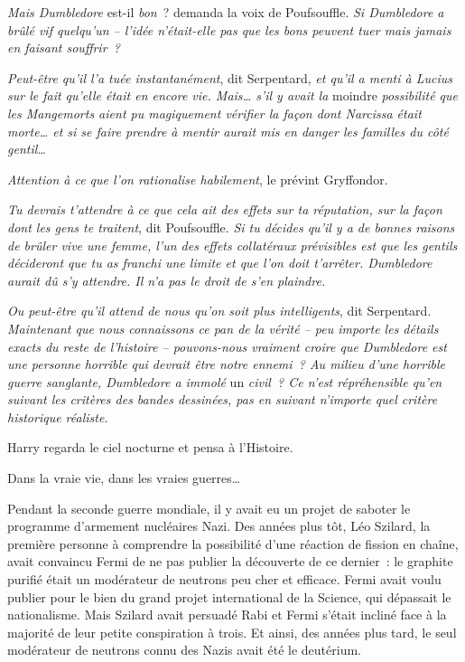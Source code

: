 \emph{Mais Dumbledore} est-il \emph{bon}~? demanda la voix de Poufsouffle.
\emph{Si Dumbledore a brûlé vif quelqu'un -- l'idée n'était-elle pas que les bons peuvent tuer mais jamais en faisant souffrir~?}

\emph{Peut-être qu'il l'a tuée instantanément}, dit Serpentard, \emph{et qu'il a menti à Lucius sur le fait qu'elle était en encore vie.
Mais… s'il y avait la} moindre \emph{possibilité que les Mangemorts aient pu magiquement vérifier la façon dont Narcissa était morte… et si se faire prendre à mentir aurait mis en danger les familles du côté gentil…}

\emph{Attention à ce que l'on rationalise habilement}, le prévint Gryffondor.

\emph{Tu devrais t'attendre à ce que cela ait des effets sur ta réputation, sur la façon dont les gens te traitent}, dit Poufsouffle.
\emph{Si tu décides qu'il y a de bonnes raisons de brûler vive une femme, l'un des effets collatéraux prévisibles est que les gentils décideront que tu as franchi une limite et que l'on doit t'arrêter.
Dumbledore aurait dû s'y attendre.
Il n'a pas le droit de s'en plaindre.}

\emph{Ou peut-être qu'il attend de nous qu'on soit plus intelligents}, dit Serpentard.
\emph{Maintenant que nous connaissons ce pan de la vérité -- peu importe les détails exacts du reste de l'histoire -- pouvons-nous vraiment croire que Dumbledore est une personne horrible qui devrait être notre ennemi~?
Au milieu d'une horrible guerre sanglante, Dumbledore a immolé} un \emph{civil~?
Ce n'est répréhensible qu'en suivant les critères des bandes dessinées, pas en suivant n'importe quel critère historique réaliste.}

Harry regarda le ciel nocturne et pensa à l'Histoire.

Dans la vraie vie, dans les vraies guerres…

Pendant la seconde guerre mondiale, il y avait eu un projet de saboter le programme d'armement nucléaires Nazi.
Des années plus tôt, Léo Szilard, la première personne à comprendre la possibilité d'une réaction de fission en chaîne, avait convaincu Fermi de ne pas publier la découverte de ce dernier~: le graphite purifié était un modérateur de neutrons peu cher et efficace.
Fermi avait voulu publier pour le bien du grand projet international de la Science, qui dépassait le nationalisme.
Mais Szilard avait persuadé Rabi et Fermi s'était incliné face à la majorité de leur petite conspiration à trois.
Et ainsi, des années plus tard, le seul modérateur de neutrons connu des Nazis avait été le deutérium.

